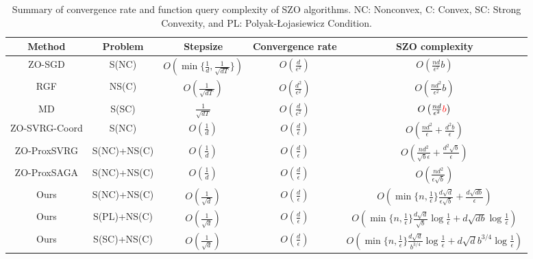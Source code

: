 \documentclass{article}
\theoremstyle{definition}
\theoremstyle{remark}
\begin{document}
\begin{table}\label{table-compare}
\begin{center}
\begin{tabular}{ |c|c|c|c|c| } 
 \hline
 Method & Problem & Stepsize& Convergence rate & SZO complexity\\ 
 \hline
  
 ZO-SGD \cite{24liunips} &S(NC) & $O\left(\min\{\frac{1}{d},\frac{1}{\sqrt{dT}}\}\right)$ & $O\left(\frac{d}{\epsilon^2}\right)$ & $O\left(\frac{nd}{\epsilon^2}b\right)$\\ 
 RGF\cite{nestrov} & NS(C) & $O\left(\frac{1}{\sqrt{dT}}\right)$ & $O\left(\frac{d^2}{\epsilon^2}\right)$ &$O\left(\frac{nd^2}{\epsilon^2}b\right)$\\ 
 MD \cite{duchi} & S(SC) & $\frac{1}{\sqrt{dT}}$  & $O\left(\frac{d}{\epsilon^2}\right)$ & $O\left(\frac{nd}{\epsilon^2}{\color{red}b}\right)$\\ 
 ZO-SVRG-Coord \cite{liunips} & S(NC)& $O\left(\frac{1}{{d}}\right)$ & $O\left(\frac{d}{\epsilon}\right)$ & $O(\frac{nd^2}{\epsilon}+\frac{d^2b}{\epsilon})$\\
  ZO-ProxSVRG\cite{Gu} & S(NC)+NS(C) & $O\left(\frac{1}{{d}}\right)$ & $O\left(\frac{d}{\epsilon}\right)$ & $O(\frac{nd^2}{\sqrt{b}\epsilon}+\frac{d^2\sqrt{b}}{\epsilon})$\\
   ZO-ProxSAGA\cite{Gu} & S(NC)+NS(C)& $O\left(\frac{1}{{d}}\right)$ & $O\left(\frac{d}{\epsilon}\right)$ & $O(\frac{nd^2}{\epsilon\sqrt{b}})$\\
   Ours & S(NC)+NS(C) & $O\left(\frac{1}{{\sqrt{d}}}\right)$ & $O\left(\frac{d}{\epsilon}\right)$ & $O\left(\min\{n,\frac{1}{\epsilon}\}\frac{d\sqrt{d}}{\epsilon\sqrt{b}}+\frac{d\sqrt{db}}{\epsilon}\right)$\\
   Ours & S(PL)+NS(C) & $O\left(\frac{1}{{\sqrt{d}}}\right)$ & $O\left(\frac{d}{\epsilon}\right)$ & {\scriptsize$O(\min\{n,\frac{1}{\epsilon}\}\frac{d\sqrt{d}}{\sqrt{b}}\log\frac{1}{\epsilon}+{d\sqrt{db}}\log\frac{1}{\epsilon})$}\\
   Ours & S(SC)+NS(C) & $O\left(\frac{1}{{\sqrt{d}}}\right)$ & $O\left(\frac{d}{\epsilon}\right)$ & {\scriptsize$O(\min\{n,\frac{1}{\epsilon}\}\frac{d\sqrt{d}}{b^{3/4}}\log\frac{1}{\epsilon}+{d\sqrt{d}b^{3/4}}\log\frac{1}{\epsilon})$}\\
 \hline
\end{tabular}\caption{Summary of convergence rate and function query complexity of SZO algorithms. NC: Nonconvex, C: Convex, SC: Strong Convexity, and PL: Polyak-Łojasiewicz Condition.}
\end{center}
\end{table}
\end{document}
